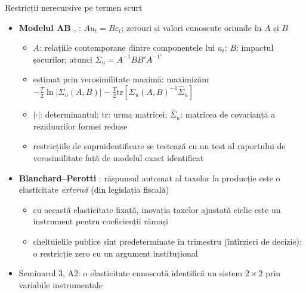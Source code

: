 \begin{frame}{Restricții nerecursive pe termen scurt}
\itemsize{\small}
\begin{itemize}
    \item \textbf{Modelul AB} , : $Au_t = B\varepsilon_t$; zerouri și valori cunoscute oriunde în $A$ și $B$
    \begin{itemize}
        \item $A$: relațiile contemporane dintre componentele lui $u_t$; $B$: impactul șocurilor; atunci $\Sigma_u = A^{-1}BB'A^{-1\prime}$
        \item estimat prin verosimilitate maximă: maximizăm $-\frac T2\ln|\Sigma_u(A, B)| - \frac T2\mathrm{tr}[\Sigma_u(A, B)^{-1}\hat\Sigma_u]$
        \item $|\cdot|$: determinantul; $\mathrm{tr}$: urma matricei; $\hat\Sigma_u$: matricea de covarianță a reziduurilor formei reduse
        \item restricțiile de supraidentificare se testează cu un test al raportului de verosimilitate față de modelul exact identificat
    \end{itemize}
    \item \textbf{Blanchard--Perotti} : răspunsul automat al taxelor la producție este o elasticitate \emph{externă} (din legislația fiscală)
    \begin{itemize}
        \item cu această elasticitate fixată, inovația taxelor ajustată ciclic este un instrument pentru coeficienții rămași
        \item cheltuielile publice sînt predeterminate în trimestru (întîrzieri de decizie): o restricție zero cu un argument instituțional
    \end{itemize}
    \item Seminarul 3, A2: o elasticitate cunoscută identifică un sistem $2\times2$ prin variabile instrumentale
\end{itemize}
\end{frame}

